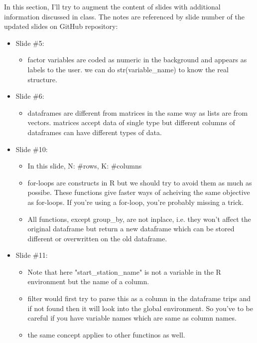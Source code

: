 In this section, I'll try to augment the content of slides with additional information discussed in class. The notes are referenced by slide number of the updated slides on GitHub repository:

\begin{itemize}
    \item Slide \#5:
    \begin{itemize}
        \item factor variables are coded as numeric in the background and appears as labels to the user. we can do str(variable\_name) to know the real structure.
    \end{itemize}
    
    \item Slide \#6:
    \begin{itemize}
        \item dataframes are different from matrices in the same way as lists are from vectors. matrices accept data of single type but different columns of dataframes can have different types of data.
    \end{itemize}
    
    \item Slide \#10:
    \begin{itemize}
        \item In this slide, N: \#rows, K: \#columns
        \item for-loops are constructs in R but we should try to avoid them as much as possibe. These functions give faster ways of acheiving the same objective as for-loops. If you're using a for-loop, you're probably missing a trick.
        \item All functions, except group\_by, are not inplace, i.e. they won't affect the original dataframe but return a new dataframe which can be stored different or overwritten on the old dataframe.
    \end{itemize}
    
    \item Slide \#11:
    \begin{itemize}
        \item Note that here "start\_station\_name" is not a variable in the R environment but the name of a column. 
        \item filter would first try to parse this as a column in the dataframe trips and if not found then it will look into the global environment. So you've to be careful if you have variable names which are same as column names.
        \item the same concept applies to other functinos as well.
    \end{itemize}
    
\end{itemize}

